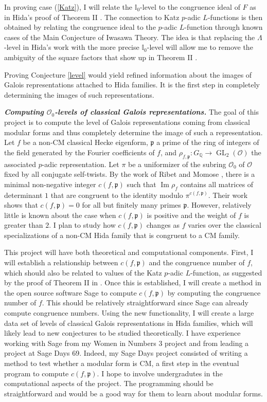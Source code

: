 \documentclass[12pt]{article}
\newcommand{\I}{\mathbb{I}}
\newcommand{\OK}{\ensuremath{\mathcal{O}}}
\newcommand{\p}{\mathfrak{p}}
\newcommand{\Q}{\mathbb{Q}}
\theoremstyle{definition}
\DeclareMathOperator{\GL}{GL}
\DeclareMathOperator{\im}{Im}
\begin{document}
In proving case (\ref{Katz}), I will relate the $\I_0$-level to the congruence ideal of $F$ as in Hida's proof of Theorem II \cite{Hida15}.  The connection to Katz $p$-adic $L$-functions is then obtained by relating the congruence ideal to the $p$-adic $L$-function through known cases of the Main Conjecture of Iwasawa Theory.  The idea is that replacing the $\Lambda$-level in Hida's work with the more precise $\I_0$-level will allow me to remove the ambiguity of the square factors that show up in Theorem II \cite{Hida15}.

Proving Conjecture \ref{level} would yield refined information about the images of Galois representations attached to Hida families.  It is the first step in completely determining the images of such representations.  

\textit{\textbf{Computing $\OK_0$-levels of classical Galois representations.}}  The goal of this project is to compute the level of Galois representations coming from classical modular forms and thus completely determine the image of such a representation.  Let $f$ be a non-CM classical Hecke eigenform, $\p$ a prime of the ring of integers of the field generated by the Fourier coefficients of $f$, and $\rho_{f, \p} : G_\Q \to \GL_2(\OK)$ the associated $p$-adic representation.  Let $\pi$ be a uniformizer of the subring $\OK_0$ of $\OK$ fixed by all conjugate self-twists.  By the work of Ribet \cite{Ribet83} and Momose \cite{Momose81}, there is a minimal non-negative integer $c(f, \p)$ such that $\im \rho_f$ contains all matrices of determinant $1$ that are congruent to the identity modulo $\pi^{c(f, \p)}$.  Their work shows that $c(f, \p) = 0$ for all but finitely many primes $\p$.  However, relatively little is known about the case when $c(f, \p)$ is positive and the weight of $f$ is greater than $2$.  I plan to study how $c(f, \p)$ changes as $f$ varies over the classical specializations of a non-CM Hida family that is congruent to a CM family.

This project will have both theoretical and computational components.  First, I will establish a relationship between $c(f, \p)$ and the congruence number of $f$, which should also be related to values of the Katz $p$-adic $L$-function, as suggested by the proof of Theorem II in \cite{Hida15}.  Once this is established, I will create a method in the open source software Sage \cite{SAGE} to compute $c(f, \p)$ by computing the congruence number of $f$.  This should be relatively straightforward since Sage can already compute congruence numbers.  Using the new functionality, I will create a large  data set of levels of classical Galois representations in Hida families, which will likely lead to new conjectures to be studied theoretically.  I have experience working with Sage from my Women in Numbers 3 project \cite{BCLMN15} and from leading a project at Sage Days 69.  Indeed, my Sage Days project consisted of writing a method to test whether a modular form is CM, a first step in the eventual program to compute $c(f, \p)$.  I hope to involve undergradutes in the computational aspects of the project.  The programming should be straightforward and would be a good way for them to learn about modular forms.
\end{document}
